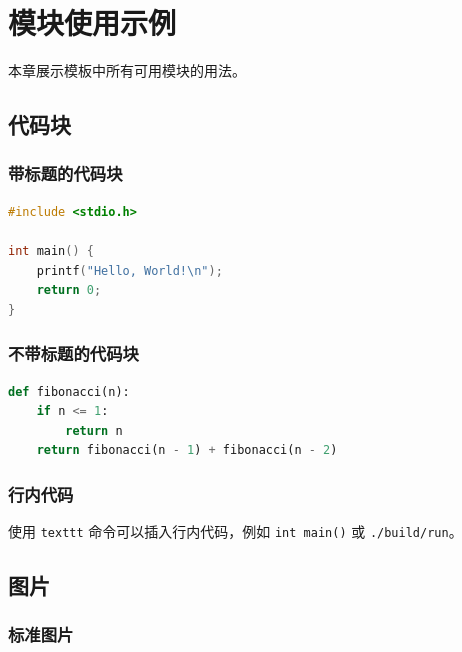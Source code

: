 \chapter{模块使用示例}

本章展示模板中所有可用模块的用法。

\section{代码块}

\subsection{带标题的代码块}

\begin{lstlisting}[language=C]
#include <stdio.h>

int main() {
    printf("Hello, World!\n");
    return 0;
}
\end{lstlisting}
\label{lst:hello}

\subsection{不带标题的代码块}

\begin{lstlisting}[language=Python]
def fibonacci(n):
    if n <= 1:
        return n
    return fibonacci(n - 1) + fibonacci(n - 2)
\end{lstlisting}

\subsection{行内代码}

使用 \texttt{texttt} 命令可以插入行内代码，例如 \texttt{int main()} 或 \texttt{./build/run}。

\section{图片}

\subsection{标准图片}


